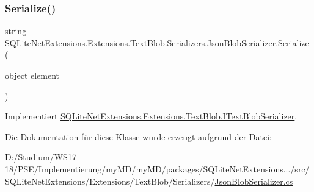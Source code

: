 \subsubsection{\texorpdfstring{Serialize()}{Serialize()}}
{\footnotesize\ttfamily string S\+Q\+Lite\+Net\+Extensions.\+Extensions.\+Text\+Blob.\+Serializers.\+Json\+Blob\+Serializer.\+Serialize (\begin{DoxyParamCaption}\item[{object}]{element }\end{DoxyParamCaption})}



Implementiert \mbox{\hyperlink{interface_s_q_lite_net_extensions_1_1_extensions_1_1_text_blob_1_1_i_text_blob_serializer_a3e0a51dfda28489d8ad53c2e9ee8ed57}{S\+Q\+Lite\+Net\+Extensions.\+Extensions.\+Text\+Blob.\+I\+Text\+Blob\+Serializer}}.



Die Dokumentation für diese Klasse wurde erzeugt aufgrund der Datei\+:\begin{DoxyCompactItemize}
\item 
D\+:/\+Studium/\+W\+S17-\/18/\+P\+S\+E/\+Implementierung/my\+M\+D/my\+M\+D/packages/\+S\+Q\+Lite\+Net\+Extensions.../src/\+S\+Q\+Lite\+Net\+Extensions/\+Extensions/\+Text\+Blob/\+Serializers/\mbox{\hyperlink{_json_blob_serializer_8cs}{Json\+Blob\+Serializer.\+cs}}\end{DoxyCompactItemize}

